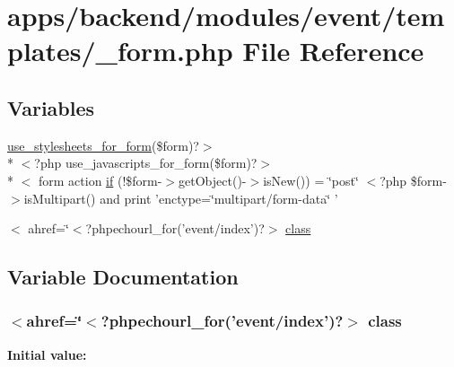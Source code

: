 \hypertarget{backend_2modules_2event_2templates_2__form_8php}{\section{apps/backend/modules/event/templates/\-\_\-form.php File Reference}
\label{backend_2modules_2event_2templates_2__form_8php}
}
\subsection*{Variables}
\begin{DoxyCompactItemize}
\item 
\hyperlink{live_2modules_2user_2templates_2__form_8php_a86bc4522fdbe625b07bc4a4d6eec3df7}{use\-\_\-stylesheets\-\_\-for\-\_\-form}(\$form)?$>$\\*
$<$?php use\-\_\-javascripts\-\_\-for\-\_\-form(\$form)?$>$\\*
$<$ form action \hyperlink{backend_2modules_2event_2templates_2__form_8php_ae30a307b320d8da5d9a945eaf68f7549}{if} (!\$form-\/$>$get\-Object()-\/$>$is\-New()) = \char`\"{}post\char`\"{} $<$?php \$form-\/$>$is\-Multipart() and print 'enctype=\char`\"{}multipart/form-\/data\char`\"{} '
\item 
$<$ ahref=\char`\"{}$<$?phpechourl\-\_\-for('event/index')?$>$ \hyperlink{backend_2modules_2event_2templates_2__form_8php_a08fcc4a8115186fd031cb20574d6242c}{class}
\end{DoxyCompactItemize}


\subsection{Variable Documentation}
\hypertarget{backend_2modules_2event_2templates_2__form_8php_a08fcc4a8115186fd031cb20574d6242c}{
\subsubsection[{class}]{\setlength{\rightskip}{0pt plus 5cm}$<$ahref=\char`\"{}$<$?phpechourl\-\_\-for('event/index')?$>$ class}}\label{backend_2modules_2event_2templates_2__form_8php_a08fcc4a8115186fd031cb20574d6242c}
{\bfseries Initial value\-:}



